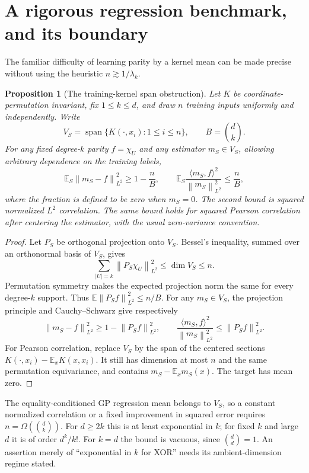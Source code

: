 \documentclass[11pt]{article}
\newtheorem{proposition}[theorem]{Proposition}
\theoremstyle{remark}\newtheorem{remark}[theorem]{Remark}
\newcommand{\E}{\mathbb E}
\newcommand{\norm}[1]{\left\lVert#1\right\rVert}
\begin{document}
\section{A rigorous regression benchmark, and its boundary}\label{sec:regression}
The familiar difficulty of learning parity by a kernel mean can be made precise without using the heuristic $n\gtrsim1/\lambda_k$.
\begin{proposition}[The training-kernel span obstruction]\label{prop:regression}
Let $K$ be coordinate-permutation invariant, fix $1\le k\le d$, and draw $n$ training inputs uniformly and independently. Write
\[
 V_S=\operatorname{span}\{K(\cdot,x_i):1\le i\le n\},\qquad B=\binom dk.
\]
For any fixed degree-$k$ parity $f=\chi_U$ and any estimator $m_S\in V_S$, allowing arbitrary dependence on the training labels,
\begin{equation}\label{eq:regressionbound}
 \E_S\norm{m_S-f}_{L^2}^2\ge1-\frac nB,
 \qquad
 \E_S\frac{\langle m_S,f\rangle^2}{\norm{m_S}_{L^2}^2}\le\frac nB,
\end{equation}
where the fraction is defined to be zero when $m_S=0$. The second bound is squared normalized $L^2$ correlation. The same bound holds for squared Pearson correlation after centering the estimator, with the usual zero-variance convention.
\end{proposition}
\begin{proof}
Let $P_S$ be orthogonal projection onto $V_S$. Bessel's inequality, summed over an orthonormal basis of $V_S$, gives
\[
 \sum_{|U|=k}\norm{P_S\chi_U}_{L^2}^2\le\dim V_S\le n.
\]
Permutation symmetry makes the expected projection norm the same for every degree-$k$ support. Thus $\E\norm{P_Sf}_{L^2}^2\le n/B$. For any $m_S\in V_S$, the projection principle and Cauchy--Schwarz give respectively
\[
 \norm{m_S-f}_{L^2}^2\ge1-\norm{P_Sf}_{L^2}^2,
 \qquad
 \frac{\langle m_S,f\rangle^2}{\norm{m_S}_{L^2}^2}
 \le\norm{P_Sf}_{L^2}^2.
\]
For Pearson correlation, replace $V_S$ by the span of the centered sections $K(\cdot,x_i)-\E_xK(x,x_i)$. It still has dimension at most $n$ and the same permutation equivariance, and contains $m_S-\E_xm_S(x)$. The target has mean zero.
\end{proof}
The equality-conditioned GP regression mean belongs to $V_S$, so a constant normalized correlation or a fixed improvement in squared error requires $n=\Omega(\binom dk)$. For $d\ge2k$ this is at least exponential in $k$; for fixed $k$ and large $d$ it is of order $d^k/k!$. For $k=d$ the bound is vacuous, since $\binom dd=1$. An assertion merely of ``exponential in $k$ for XOR'' needs its ambient-dimension regime stated.
\end{document}
